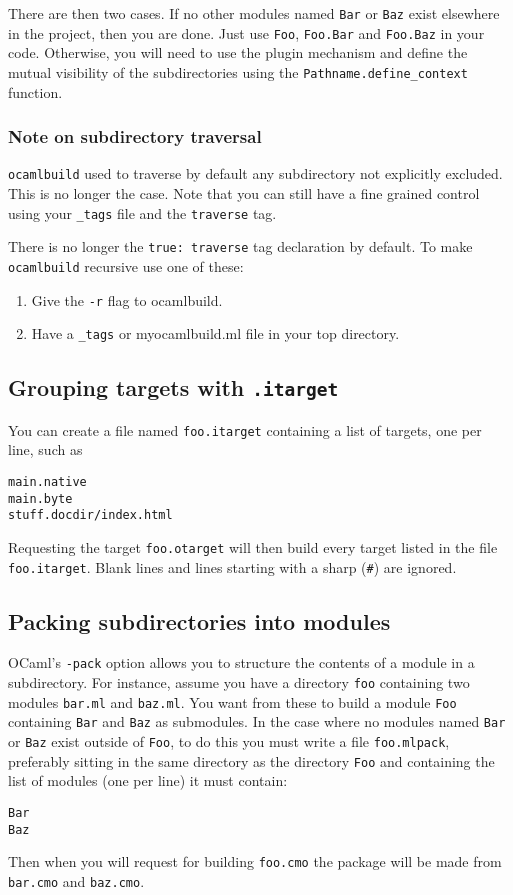 \documentclass[9pt]{article}
\newcommand{\ocb}{\texttt{ocamlbuild}\xspace}
\newcommand{\tags}{\texttt{\_tags}\xspace}
\begin{document}
There are then two cases.  If no other modules named \texttt{Bar} or
\texttt{Baz} exist elsewhere in the project, then you are done.  Just use
\texttt{Foo}, \texttt{Foo.Bar} and \texttt{Foo.Baz} in your code.
Otherwise, you will need to use the plugin mechanism and define the mutual
visibility of the subdirectories using the \texttt{Pathname.define\_context}
function.

\subsubsection{Note on subdirectory traversal}
\ocb  used  to  traverse  by  default any subdirectory not explicitly excluded.
This  is  no  longer  the  case.  Note  that  you can still have a fine grained
control using your \tags file and the \texttt{traverse} tag.

There  is  no longer the \texttt{true: traverse} tag declaration by default. To
make \ocb recursive use one of these:
\begin{enumerate}
\item Give the \texttt{-r} flag to ocamlbuild.
\item Have a \tags or myocamlbuild.ml file in your top directory.
\end{enumerate}

\subsection{Grouping targets with \texttt{.itarget}}
You can create a file named \texttt{foo.itarget} containing
a list of targets, one per line, such as
\begin{verbatim}
main.native
main.byte
stuff.docdir/index.html
\end{verbatim}
Requesting the target \texttt{foo.otarget} will then build every target
listed in the file \texttt{foo.itarget}. Blank lines and lines starting
with a sharp (\texttt{\#}) are ignored.
\subsection{Packing subdirectories into modules}
OCaml's \texttt{-pack} option allows you to structure the contents of a
module in a subdirectory.  For instance, assume you have a directory
\texttt{foo} containing two modules \texttt{bar.ml} and \texttt{baz.ml}.
You want from these to build a module \texttt{Foo} containing \texttt{Bar}
and \texttt{Baz} as submodules.  In the case where no modules named
\texttt{Bar} or \texttt{Baz} exist outside of \texttt{Foo}, to do this you
must write a file \texttt{foo.mlpack}, preferably sitting in the same
directory as the directory \texttt{Foo} and containing the list of modules
(one per line) it must contain:
\begin{verbatim}
Bar
Baz
\end{verbatim}
Then when you will request for building \texttt{foo.cmo} the package will be
made from \texttt{bar.cmo} and \texttt{baz.cmo}.
\end{document}
